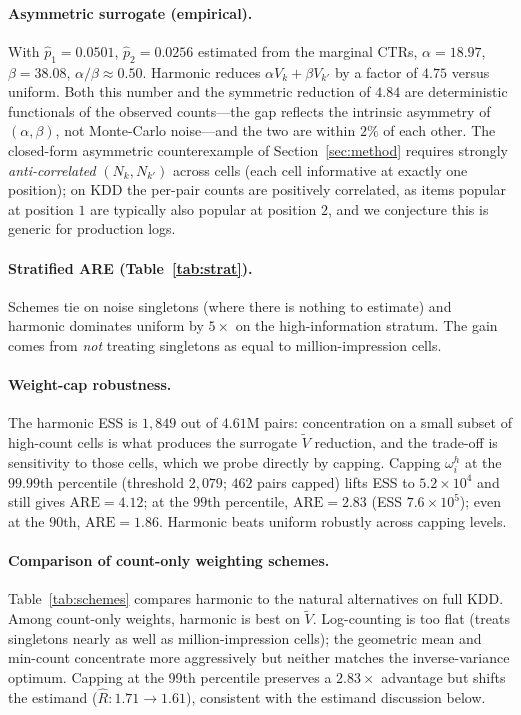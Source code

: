 \documentclass[sigconf]{acmart}
\begin{document}
\paragraph{Asymmetric surrogate (empirical).}
With $\hat p_1=0.0501$, $\hat p_2=0.0256$ estimated from the marginal
CTRs, $\alpha=18.97$, $\beta=38.08$, $\alpha/\beta\approx 0.50$.
Harmonic reduces $\alpha V_k+\beta V_{k'}$ by a factor of $4.75$ versus
uniform. Both this number and the symmetric reduction of $4.84$ are
deterministic functionals of the observed counts---the gap reflects the
intrinsic asymmetry of $(\alpha,\beta)$, not Monte-Carlo noise---and the
two are within $2\%$ of each other. The closed-form asymmetric
counterexample of Section~\ref{sec:method} requires strongly
\emph{anti-correlated} $(N_k,N_{k'})$ across cells (each cell informative
at exactly one position); on KDD the per-pair counts are positively
correlated, as items popular at position $1$ are typically also popular
at position $2$, and we conjecture this is generic for production logs.

\paragraph{Stratified ARE (Table~\ref{tab:strat}).}
Schemes tie on noise singletons (where there is nothing to estimate) and
harmonic dominates uniform by $5\times$ on the high-information stratum.
The gain comes from \emph{not} treating singletons as equal to
million-impression cells.

\paragraph{Weight-cap robustness.}
The harmonic ESS is $1{,}849$ out of $4.61$M pairs: concentration on a
small subset of high-count cells is what produces the surrogate
$\widetilde V$ reduction, and the trade-off is sensitivity to those
cells, which we probe directly by capping. Capping $\omega_i^h$ at
the $99.99$th percentile (threshold $2{,}079$; $462$ pairs capped) lifts
ESS to $5.2{\times}10^4$ and still gives
$\mathrm{ARE}=4.12$; at the $99$th percentile, $\mathrm{ARE}=2.83$ (ESS
$7.6{\times}10^5$); even at the $90$th, $\mathrm{ARE}=1.86$. Harmonic
beats uniform robustly across capping levels.

\paragraph{Comparison of count-only weighting schemes.}
Table~\ref{tab:schemes} compares harmonic to the natural alternatives on
full KDD. Among count-only weights, harmonic is best on $\widetilde V$.
Log-counting is too flat (treats singletons nearly as well as
million-impression cells); the geometric mean and min-count concentrate
more aggressively but neither matches the inverse-variance optimum.
Capping at the 99th percentile preserves a $2.83\times$ advantage but
shifts the estimand ($\hat R: 1.71\to 1.61$), consistent with the
estimand discussion below.
\end{document}
